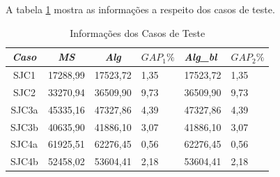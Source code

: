 	A tabela \ref{tab:graf1} mostra as informações a respeito dos casos de teste.
	\begin{table}[]
\centering
\label{tab:graf1}
\begin{tabular}{ccclll}
\hline
\multicolumn{1}{|c|}{\textit{Caso}} & \multicolumn{1}{c|}{\textit{MS}} & \multicolumn{1}{c|}{\textit{Alg}} & \multicolumn{1}{l|}{$GAP_1\%$} & \multicolumn{1}{l|}{\textit{Alg\_bl}} & \multicolumn{1}{l|}{$GAP_2\%$} \\ \hline
SJC1                                & 17288,99                         & 17523,72                          & 1,35                           & 17523,72                              & 1,35                           \\
SJC2                                & 33270,94                         & 36509,90                          & 9,73                           & 36509,90                              & 9,73                           \\
SJC3a                               & 45335,16                         & 47327,86                          & 4,39                           & 47327,86                              & 4,39                           \\
\multicolumn{1}{l}{SJC3b}           & \multicolumn{1}{l}{40635,90}     & \multicolumn{1}{l}{41886,10}      & 3,07                           & 41886,10                              & 3,07                           \\
\multicolumn{1}{l}{SJC4a}           & \multicolumn{1}{l}{61925,51}     & \multicolumn{1}{l}{62276,45}      & 0,56                           & 62276,45                              & 0,56                           \\
\multicolumn{1}{l}{SJC4b}           & \multicolumn{1}{l}{52458,02}     & \multicolumn{1}{l}{53604,41}      & 2,18                           & 53604,41                              & 2,18
\end{tabular}
\caption{Informações dos Casos de Teste}
\end{table}

